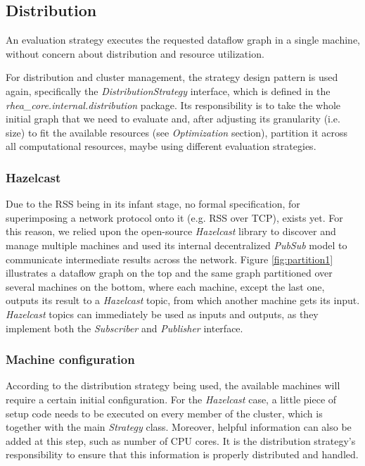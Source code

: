 \documentclass[sigplan,review,anonymous]{acmart}\settopmatter{printfolios=true,printacmref=false}
\begin{document}
\subsection{Distribution}

An evaluation strategy executes the requested dataflow graph in a single machine, without concern about distribution and resource utilization.

For distribution and cluster management, the strategy design pattern is used again, specifically the \textit{DistributionStrategy} interface, which is defined in the \textit{rhea\_core.internal.distribution} package. Its responsibility is to take the whole initial graph that we need to evaluate and, after adjusting its granularity (i.e. size) to fit the available resources (see \textit{Optimization} section), partition it across all computational resources, maybe using different evaluation strategies.

\subsubsection{Hazelcast}

Due to the RSS being in its infant stage, no formal specification, for superimposing a network protocol onto it (e.g. RSS over TCP), exists yet. For this reason, we relied upon the open-source \textit{Hazelcast} library to discover and manage multiple machines and used its internal decentralized \textit{PubSub} model to communicate intermediate results across the network. Figure \ref{fig:partition1} illustrates a dataflow graph on the top and the same graph partitioned over several machines on the bottom, where each machine, except the last one, outputs its result to a \textit{Hazelcast} topic, from which another machine gets its input. \textit{Hazelcast} topics can immediately be used as inputs and outputs, as they implement both the \textit{Subscriber} and \textit{Publisher} interface.


\subsubsection{Machine configuration}

According to the distribution strategy being used, the available machines will require a certain initial configuration. For the \textit{Hazelcast} case, a little piece of setup code needs to be executed on every member of the cluster, which is together with the main \textit{Strategy} class. Moreover, helpful information can also be added at this step, such as number of CPU cores. It is the distribution strategy's responsibility to ensure that this information is properly distributed and handled.
\end{document}
